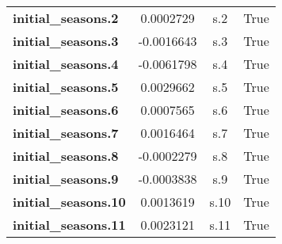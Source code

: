 \begin{center}
\begin{tabular}{lccc}
\textbf{initial\_seasons.2}  &            0.0002729 &                  s.2 &                 True  \\
\textbf{initial\_seasons.3}  &           -0.0016643 &                  s.3 &                 True  \\
\textbf{initial\_seasons.4}  &           -0.0061798 &                  s.4 &                 True  \\
\textbf{initial\_seasons.5}  &            0.0029662 &                  s.5 &                 True  \\
\textbf{initial\_seasons.6}  &            0.0007565 &                  s.6 &                 True  \\
\textbf{initial\_seasons.7}  &            0.0016464 &                  s.7 &                 True  \\
\textbf{initial\_seasons.8}  &           -0.0002279 &                  s.8 &                 True  \\
\textbf{initial\_seasons.9}  &           -0.0003838 &                  s.9 &                 True  \\
\textbf{initial\_seasons.10} &            0.0013619 &                 s.10 &                 True  \\
\textbf{initial\_seasons.11} &            0.0023121 &                 s.11 &                 True  \\
\bottomrule
\end{tabular}
\end{center}